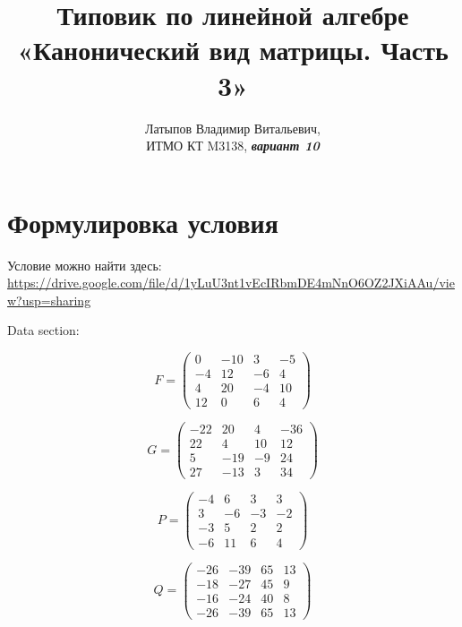 \documentclass[12pt, a4paper]{article}
\author{Латыпов Владимир Витальевич, \\ ИТМО КТ M3138, \Huge{\textit{\textbf{вариант 10}}}}
\title{Типовик по линейной алгебре «Канонический вид матрицы. Часть 3»}
\begin{document}
    \tit

    \section{Формулировка условия}

    \begin{statement}
        Условие можно найти здесь: \url{https://drive.google.com/file/d/1yLuU3nt1vEcIRbmDE4mNnO6OZ2JXiAAu/view?usp=sharing}

        Data section:

        \begin{equation}
            F = \left(\begin{matrix}
                0 & -10 & 3 & -5 \\
                -4 & 12 & -6 & 4 \\
                4 & 20 & -4 & 10 \\
                12 & 0 & 6 & 4
            \end{matrix}\right)
        \end{equation}

        \begin{equation}
            G = \left(\begin{matrix}
                -22 & 20 & 4 & -36 \\
                22 & 4 & 10 & 12 \\
                5 & -19 & -9 & 24 \\
                27 & -13 & 3 & 34
            \end{matrix}\right)
        \end{equation}

        \begin{equation}
            P = \left(\begin{matrix}
                -4 & 6 & 3 & 3 \\
                3 & -6 & -3 & -2 \\
                -3 & 5 & 2 & 2 \\
                -6 & 11 & 6 & 4
            \end{matrix}\right)
        \end{equation}

        \begin{equation}
            Q = \left(\begin{matrix}
                -26 & -39 & 65 & 13 \\
                -18 & -27 & 45 & 9 \\
                -16 & -24 & 40 & 8 \\
                -26 & -39 & 65 & 13
            \end{matrix}\right)
        \end{equation}


\end{statement}
\end{document}
